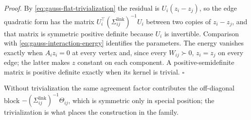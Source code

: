 \noindent\emph{Proof.}
By \eqref{eq:gauss-flat-trivialization} the residual is \(U_i(z_i-z_j)\), so the
edge quadratic form has the matrix
\(U_i^\top(\Sigma^{\mathrm{link}}_{ij})^{-1}U_i\) between two copies of
\(z_i-z_j\), and that matrix is symmetric positive definite because \(U_i\) is
invertible.
Comparison with \eqref{eq:gauss-interaction-energy} identifies the parameters.
The energy vanishes exactly when \(A_iz_i=0\) at every vertex and, since every
\(W_{ij}\succ0\), \(z_i=z_j\) on every edge; the latter makes \(z\) constant on
each component. A positive-semidefinite matrix is positive definite exactly
when its kernel is trivial. \(\square\)

Without trivialization the same agreement factor contributes the off-diagonal
block \(-(\Sigma^{\mathrm{link}}_{ij})^{-1}\Theta_{ij}\), which is symmetric only
in special position; the trivialization is what places the construction in
the family.
